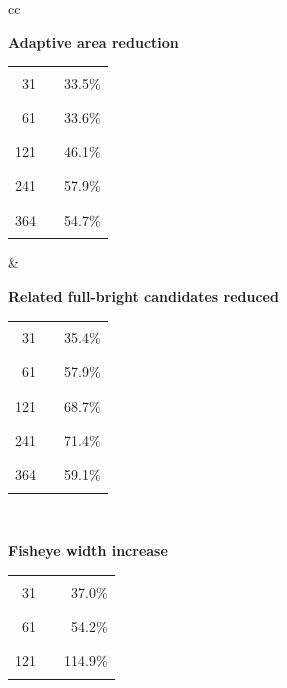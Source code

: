 \documentclass[11pt,a4paper,oneside,extrafontsizes]{memoir}
\begin{document}
\begin{center}
\begin{figure}[htbp]
\centering
\begin{tabular}{cc}
\begin{minipage}[t]{0.46\textwidth}
\centering
\textbf{Adaptive area reduction}\\[-0.2em]
\begin{tabular}{@{}r l r@{}}
31 & \textcolor{blue!70!black}{\rule{0.1155\textwidth}{1.1ex}} & 33.5\% \\
61 & \textcolor{blue!70!black}{\rule{0.1159\textwidth}{1.1ex}} & 33.6\% \\
121 & \textcolor{blue!70!black}{\rule{0.1591\textwidth}{1.1ex}} & 46.1\% \\
241 & \textcolor{blue!70!black}{\rule{0.2000\textwidth}{1.1ex}} & 57.9\% \\
364 & \textcolor{blue!70!black}{\rule{0.1887\textwidth}{1.1ex}} & 54.7\% \\
\end{tabular}
\end{minipage}
&
\begin{minipage}[t]{0.46\textwidth}
\centering
\textbf{Related full-bright candidates reduced}\\[-0.2em]
\begin{tabular}{@{}r l r@{}}
31 & \textcolor{blue!70!black}{\rule{0.0992\textwidth}{1.1ex}} & 35.4\% \\
61 & \textcolor{blue!70!black}{\rule{0.1623\textwidth}{1.1ex}} & 57.9\% \\
121 & \textcolor{blue!70!black}{\rule{0.1926\textwidth}{1.1ex}} & 68.7\% \\
241 & \textcolor{blue!70!black}{\rule{0.2000\textwidth}{1.1ex}} & 71.4\% \\
364 & \textcolor{blue!70!black}{\rule{0.1656\textwidth}{1.1ex}} & 59.1\% \\
\end{tabular}
\end{minipage} \\[1.2em]
\begin{minipage}[t]{0.46\textwidth}
\centering
\textbf{Fisheye width increase}\\[-0.2em]
\begin{tabular}{@{}r l r@{}}
31 & \textcolor{blue!70!black}{\rule{0.0247\textwidth}{1.1ex}} & 37.0\% \\
61 & \textcolor{blue!70!black}{\rule{0.0361\textwidth}{1.1ex}} & 54.2\% \\
121 & \textcolor{blue!70!black}{\rule{0.0765\textwidth}{1.1ex}} & 114.9\% \\

\end{tabular}
\end{minipage}
\end{tabular}
\end{figure}
\end{center}
\end{document}
